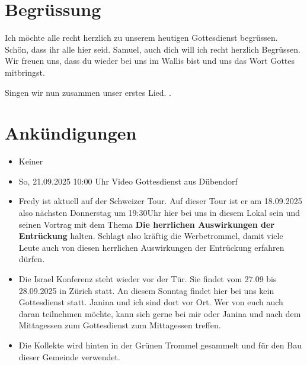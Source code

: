 \documentclass{../../inc/mybib}
\begin{document}
\section{Begrüssung}
Ich möchte alle recht herzlich zu unserem heutigen Gottesdienst begrüssen. Schön, dass ihr alle hier seid. Samuel, auch dich will ich recht herzlich Begrüssen. Wir freuen uns, dass du wieder bei uns im Wallis bist und uns das Wort Gottes mitbringst. 

\beten{}

Singen wir nun zusammen unser erstes Lied.
{}.

\section{Ankündigungen}
\begin{itemize}
    \item {} Keiner
    \item {} So, 21.09.2025 10:00 Uhr Video Gottesdienst aus Dübendorf
    \item {} Fredy ist aktuell auf der Schweizer Tour. Auf dieser Tour ist er am 18.09.2025 also nächsten Donnerstag um 19:30Uhr hier bei uns in diesem Lokal sein und seinen Vortrag mit dem Thema \textbf{Die herrlichen Auswirkungen der Entrückung} halten. Schlagt also kräftig die Werbetrommel, damit viele Leute auch von diesen herrlichen Auswirkungen der Entrückung erfahren dürfen.
    \item {} Die Israel Konferenz steht wieder vor der Tür. Sie findet vom 27.09 bis 28.09.2025 in Zürich statt. An diesem Sonntag findet hier bei uns kein Gottesdienst statt. Janina und ich sind dort vor Ort. Wer von euch auch daran teilnehmen möchte, kann sich gerne bei mir oder Janina und nach dem Mittagessen zum Gottesdienst zum Mittagessen treffen.
    \item Die Kollekte wird hinten in der Grünen Trommel gesammelt und für den Bau dieser Gemeinde verwendet.
\end{itemize}
\end{document}

